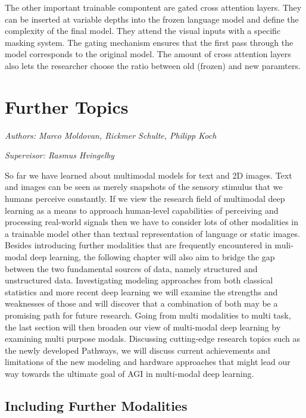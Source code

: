 \documentclass[
]{krantz}
\begin{document}
The other important trainable compontent are gated cross attention layers. They can be inserted at variable depths into the frozen language model and define the complexity of the final model. They attend the visual inputs with a specific masking system.
The gating mechanism ensures that the first pass through the model corresponds to the original model. The amount of cross attention layers also lets
the researcher choose the ratio between old (frozen) and new paramters.

\hypertarget{further-topics}{%
\chapter{Further Topics}\label{further-topics}}

\emph{Authors: Marco Moldovan, Rickmer Schulte, Philipp Koch}

\emph{Supervisor: Rasmus Hvingelby}

So far we have learned about multimodal models for text and 2D images. Text and images can be seen as merely snapshots of the sensory stimulus that we humans perceive constantly. If we view the research field of multimodal deep learning as a means to approach human-level capabilities of perceiving and processing real-world signals then we have to consider lots of other modalities in a trainable model other than textual representation of language or static images. Besides introducing further modalities that are frequently encountered in muli-modal deep learning, the following chapter will also aim to bridge the gap between the two fundamental sources of data, namely structured and unstructured data. Investigating modeling approaches from both classical statistics and more recent deep learning we will examine the strengths and weaknesses of those and will discover that a combination of both may be a promising path for future research. Going from multi modalities to multi task, the last section will then broaden our view of multi-modal deep learning by examining multi purpose modals. Discussing cutting-edge research topics such as the newly developed Pathways, we will discuss current achievements and limitations of the new modeling and hardware approaches that might lead our way towards the ultimate goal of AGI in multi-modal deep learning.

\hypertarget{including-further-modalities}{%
\section{Including Further Modalities}\label{including-further-modalities}}
\end{document}
